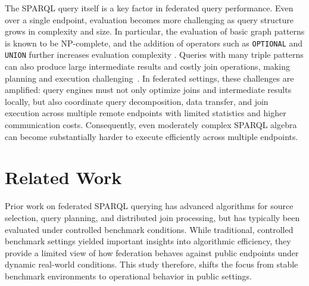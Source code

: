 \documentclass[runningheads]{llncs}
\begin{document}
The SPARQL query itself is a key factor in federated query performance. 
Even over a single endpoint, evaluation becomes more challenging as query structure grows in complexity and size.
In particular, the evaluation of basic graph patterns is known to be NP-complete, and the addition of operators such as \texttt{OPTIONAL} and \texttt{UNION} further increases evaluation complexity \cite{Perez2009Semantics}. 
Queries with many triple patterns can also produce large intermediate results and costly join operations, making planning and execution challenging~\cite{Schmidt2010Foundations}. 
In federated settings, these challenges are amplified: query engines must not only optimize joins and intermediate results locally, but also coordinate query decomposition, data transfer, and join execution across multiple remote endpoints with limited statistics and higher communication costs. 
Consequently, even moderately complex SPARQL algebra can become substantially harder to execute efficiently across multiple endpoints.


\section{Related Work}\label{sec3}
Prior work on federated SPARQL querying has advanced algorithms for source selection, query planning, and distributed join processing, but has typically been evaluated under controlled benchmark conditions. 
While traditional, controlled benchmark settings yielded important insights into algorithmic efficiency, they provide a limited view of how federation behaves against public endpoints under dynamic real-world conditions. 
This study therefore, shifts the focus from stable benchmark environments to operational behavior in public settings.
\end{document}
